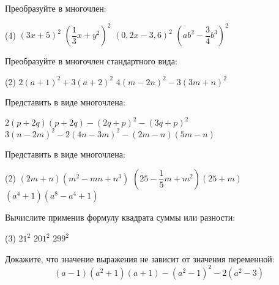 \begin{exam}
	\begin{listofex}
	\item {}
	\item Преобразуйте в многочлен:
	\begin{tasks}(4)
		\task \( (3x+5)^2 \)
		\task \( \left( \dfrac{1}{3}x+y^2 \right)^2 \)
		\task \( (0,2x-3,6)^2 \)
		\task \( \left( ab^2-\dfrac{3}{4}b^3 \right)^2 \)
	\end{tasks}
	\item Преобразуйте в многочлен стандартного вида:
	\begin{tasks}(2)
		\task \( 2(a+1)^2 +3(a+2)^2\)
		\task \( 4(m-2n)^2-3(3m+n)^2 \)
	\end{tasks}
	\item Представить в виде многочлена:
	\begin{tasks} 
		\task \( 2(p+2q)(p+2q)-(2q+p)^2-(3q+p)^2 \)
		\task \( 3(n-2m)^2-2(4n-3m)^2-(2m-n)(5m-n) \)
	\end{tasks}
	\item Представить в виде многочлена:
	\begin{tasks}(2)
		\task \( (2m+n)(m^2-mn+n^3) \)
		\task \( \left( 25-\dfrac{1}{5}m+m^2 \right)(25+m) \)
		\task \( (a^4+1)(a^8-a^4+1) \)
	\end{tasks}
	\item Вычислите применив формулу квадрата суммы или разности:
	\begin{tasks}(3)
		\task \( 21^2 \)
		\task \( 201^2 \)
		\task \( 299^2 \)
	\end{tasks}
	\item Докажите, что значение выражения не зависит от значения переменной:
	\[ (a-1)(a^2+1)(a+1)-(a^2-1)^2-2(a^2-3) \]
	\end{listofex}
\end{exam}
